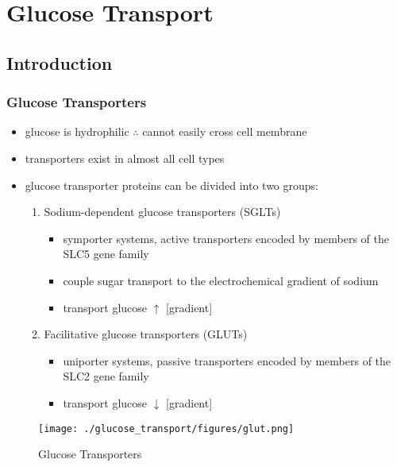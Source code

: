 \documentclass{scrartcl}
\begin{document}
\section{Glucose Transport}
\label{sec:org5fe9820}
\subsection{Introduction}
\label{sec:org89392ab}
\subsubsection{Glucose Transporters}
\label{sec:orgeb22365}
\begin{itemize}
\item glucose is hydrophilic \(\therefore\) cannot easily cross cell membrane
\item transporters exist in almost all cell types
\item glucose transporter proteins can be divided into two groups:
\begin{enumerate}
\item Sodium-dependent glucose transporters (SGLTs)
\begin{itemize}
\item symporter systems, active transporters encoded by members of
the SLC5 gene family
\item couple sugar transport to the electrochemical gradient of sodium
\item transport glucose \(\uparrow\) [gradient]
\end{itemize}
\item Facilitative glucose transporters (GLUTs)
\begin{itemize}
\item uniporter systems, passive transporters encoded by members of the SLC2 gene family
\item transport glucose \(\downarrow\) [gradient]
\end{itemize}
\end{enumerate}
\end{itemize}

\begin{figure}[htbp]
\centering
\texttt{[image: ./glucose\_transport/figures/glut.png]}
\caption[glucose transporters]{\label{fig:org4cffb9c}
Glucose Transporters}
\end{figure}
\end{document}
